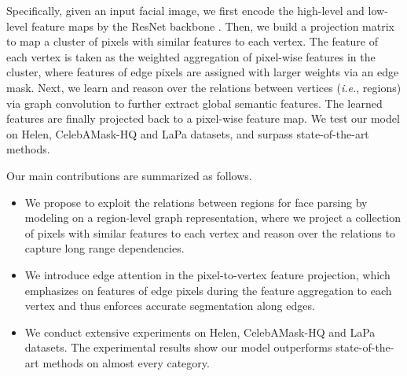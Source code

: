 \documentclass[runningheads]{llncs}
\def\ie{{\it i.e.}}
\begin{document}
Specifically, given an input facial image, we first encode the high-level and low-level feature maps by the ResNet backbone \cite{he2016deep}. 
Then, we build a projection matrix to map a cluster of pixels with similar features to each vertex. 
The feature of each vertex is taken as the weighted aggregation of pixel-wise features in the cluster, where features of edge pixels are assigned with larger weights via an edge mask. 
Next, we learn and reason over the relations between vertices (\ie, regions) via graph convolution \cite{henaff2015deep,defferrard2016convolutional} to further extract global semantic features. 
The learned features are finally projected back to a pixel-wise feature map. 
We test our model on Helen, CelebAMask-HQ and LaPa datasets, and surpass state-of-the-art methods.








Our main contributions are summarized as follows.
\begin{itemize}
    \item We propose to exploit the relations between regions for face parsing by modeling on a region-level graph representation, where we project a collection of pixels with similar features to each vertex and reason over the relations to capture long range dependencies.
    
    \item We introduce edge attention in the pixel-to-vertex feature projection, which emphasizes on features of edge pixels during the feature aggregation to each vertex and thus enforces accurate segmentation along edges. 
\item We conduct extensive experiments on Helen, CelebAMask-HQ and LaPa datasets. The experimental results show our model outperforms state-of-the-art methods on almost every category.
\end{itemize}
\end{document}
